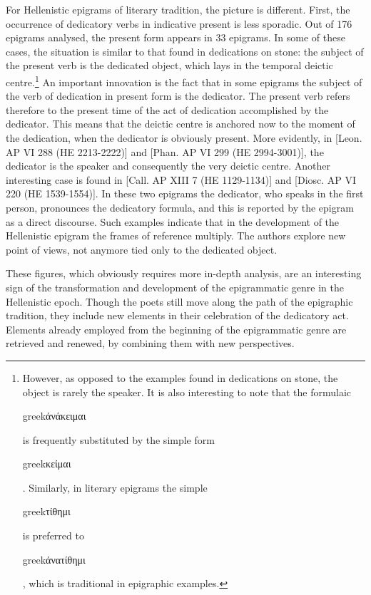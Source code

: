 \documentclass[amsthm,ebook]{saparticle}
\begin{document}
For Hellenistic epigrams of literary tradition, the picture is different. First, the occurrence of dedicatory verbs in
indicative present is less sporadic. Out of 176 epigrams analysed, the present form appears in 33 epigrams. In some of
these cases, the situation is similar to that found in dedications on stone: the subject of the present verb is the
dedicated object, which lays in the temporal deictic centre.\footnote{ However, as opposed to the examples found in
dedications on stone, the object is rarely the speaker. It is also interesting to note that the formulaic
\begin{otherlanguage*}{greek}ἀνάκειμαι\end{otherlanguage*} is frequently substituted by the simple form \begin{otherlanguage*}{greek}κείμαι\end{otherlanguage*}. Similarly, in literary
epigrams the simple \begin{otherlanguage*}{greek}τίθημι\end{otherlanguage*} is preferred to \begin{otherlanguage*}{greek}ἀνατίθημι\end{otherlanguage*}, which is traditional in epigraphic
examples.} An important innovation is the fact that in some epigrams the subject of the verb of dedication in present
form is the dedicator. The present verb refers therefore to the present time of the act of dedication accomplished by
the dedicator. This means that the deictic centre is anchored now to the moment of the dedication, when the dedicator
is obviously present. More evidently, in [Leon. AP VI 288 (HE 2213-2222)] and [Phan. AP VI 299 (HE 2994-3001)], the
dedicator is the speaker and consequently the very deictic centre. Another interesting case is found in [Call. AP XIII
7 (HE 1129-1134)] and [Diosc. AP VI 220 (HE 1539-1554)]. In these two epigrams the dedicator, who speaks in the first
person, pronounces the dedicatory formula, and this is reported by the epigram as a direct discourse. Such examples
indicate that in the development of the Hellenistic epigram the frames of reference multiply. The authors explore new
point of views, not anymore tied only to the dedicated object.

These figures, which obviously requires more in-depth analysis, are an interesting sign of the transformation and
development of the epigrammatic genre in the Hellenistic epoch. Though the poets still move along the path of the
epigraphic tradition, they include new elements in their celebration of the dedicatory act. Elements already employed
from the beginning of the epigrammatic genre are retrieved and renewed, by combining them with new perspectives. 
\end{document}
